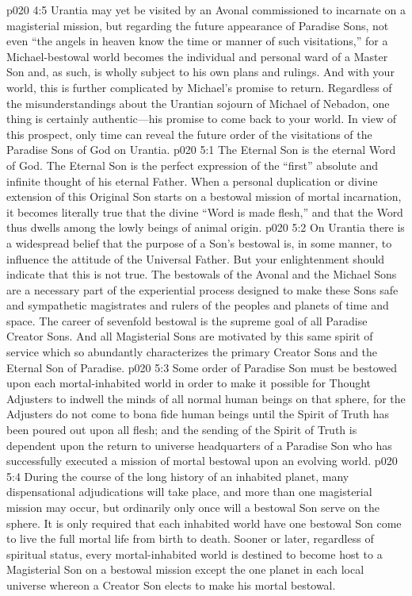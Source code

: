 \vs p020 4:5 Urantia may yet be visited by an Avonal commissioned to incarnate on a magisterial mission, but regarding the future appearance of Paradise Sons, not even “the angels in heaven know the time or manner of such visitations,” for a Michael\hyp{}bestowal world becomes the individual and personal ward of a Master Son and, as such, is wholly subject to his own plans and rulings. And with your world, this is further complicated by Michael’s promise to return. Regardless of the misunderstandings about the Urantian sojourn of Michael of Nebadon, one thing is certainly authentic---his promise to come back to your world. In view of this prospect, only time can reveal the future order of the visitations of the Paradise Sons of God on Urantia.
\vs p020 5:1 The Eternal Son is the eternal Word of God. The Eternal Son is the perfect expression of the “first” absolute and infinite thought of his eternal Father. When a personal duplication or divine extension of this Original Son starts on a bestowal mission of mortal incarnation, it becomes literally true that the divine “Word is made flesh,” and that the Word thus dwells among the lowly beings of animal origin.
\vs p020 5:2 On Urantia there is a widespread belief that the purpose of a Son’s bestowal is, in some manner, to influence the attitude of the Universal Father. But your enlightenment should indicate that this is not true. The bestowals of the Avonal and the Michael Sons are a necessary part of the experiential process designed to make these Sons safe and sympathetic magistrates and rulers of the peoples and planets of time and space. The career of sevenfold bestowal is the supreme goal of all Paradise Creator Sons. And all Magisterial Sons are motivated by this same spirit of service which so abundantly characterizes the primary Creator Sons and the Eternal Son of Paradise.
\vs p020 5:3 Some order of Paradise Son must be bestowed upon each mortal\hyp{}inhabited world in order to make it possible for Thought Adjusters to indwell the minds of all normal human beings on that sphere, for the Adjusters do not come to  bona fide human beings until the Spirit of Truth has been poured out upon all flesh; and the sending of the Spirit of Truth is dependent upon the return to universe headquarters of a Paradise Son who has successfully executed a mission of mortal bestowal upon an evolving world.
\vs p020 5:4 During the course of the long history of an inhabited planet, many dispensational adjudications will take place, and more than one magisterial mission may occur, but ordinarily only once will a bestowal Son serve on the sphere. It is only required that each inhabited world have one bestowal Son come to live the full mortal life from birth to death. Sooner or later, regardless of spiritual status, every mortal\hyp{}inhabited world is destined to become host to a Magisterial Son on a bestowal mission except the one planet in each local universe whereon a Creator Son elects to make his mortal bestowal.\plusone
